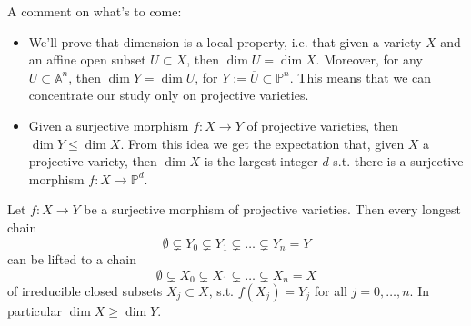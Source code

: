A comment on what's to come:
\begin{itemize}
	\item We'll prove that dimension is a local property, i.e. that given a variety $X$ and an affine open subset $U \subset X$, 
		then $\dim U = \dim X$.
		Moreover, for any $U \subset \mathbb{A}^{n}$, then $\dim Y = \dim U$, for $Y:= \overline{U} \subset \mathbb{P}^{n}$.
		This means that we can concentrate our study only on projective varieties.
	\item Given a surjective morphism $f: X \to Y$ of projective varieties, then $\dim Y \leq \dim X$.
		From this idea we get the expectation that, given $X$ a projective variety, then $\dim X$ is the largest integer $d$ 
		s.t. there is a surjective morphism $f: X \to \mathbb{P}^{d}$.
\end{itemize}

\begin{lem}
	Let $f: X \to Y$ be a surjective morphism of projective varieties.
	Then every longest chain
	\begin{equation}
	\emptyset \subsetneq Y_0 \subsetneq Y_1 \subsetneq
	\ldots \subsetneq Y_n = Y
	\end{equation} 
	can be lifted to a chain
	\begin{equation}
	\emptyset \subsetneq X_0 \subsetneq X_1 \subsetneq \ldots
	\subsetneq X_n = X
	\end{equation} 
	of irreducible closed subsets $X_j \subset X$, s.t. $f(X_j) = Y_j$ for all $j = 0, \ldots, n$.
	In particular $\dim X \geq \dim Y$.
\end{lem} 

